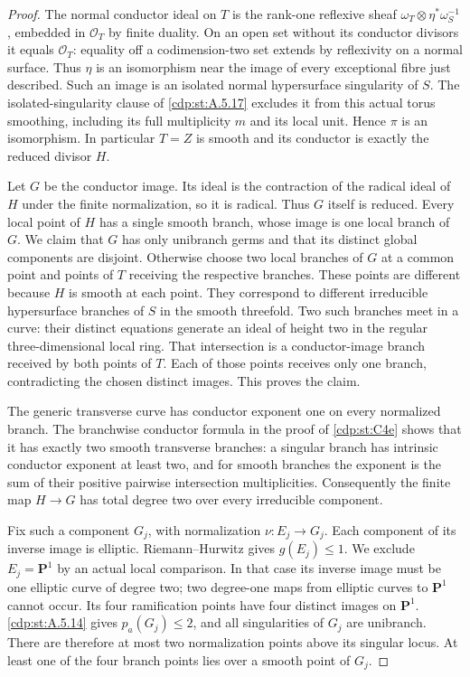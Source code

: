 \begin{proof}
The normal conductor ideal on $T$ is the rank-one reflexive
sheaf $\omega_T\otimes\eta^*\omega_S^{-1}$, embedded in
$\mathcal O_T$ by finite duality. On an open set without
its conductor divisors it equals $\mathcal O_T$: equality
off a codimension-two set extends by reflexivity on a normal
surface. Thus $\eta$ is an isomorphism near the image of
every exceptional fibre just described. Such an image is
an isolated normal hypersurface singularity of $S$.
The isolated-singularity clause of \ref{cdp:st:A.5.17} excludes it from
this actual torus smoothing, including its full multiplicity
$m$ and its local unit. Hence $\pi$ is an isomorphism.
In particular $T=Z$ is smooth and its conductor is exactly
the reduced divisor $H$.

Let $G$ be the conductor image. Its ideal is the contraction
of the radical ideal of $H$ under the finite normalization,
so it is radical. Thus $G$ itself is reduced. Every local
point of $H$ has a single smooth branch, whose image is one
local branch of $G$. We claim that $G$ has only unibranch
germs and that its distinct global components are disjoint.
Otherwise choose two local branches of $G$ at a common point
and points of $T$ receiving the respective branches. These
points are different because $H$ is smooth at each point.
They correspond to different irreducible hypersurface
branches of $S$ in the smooth threefold. Two such branches
meet in a curve: their distinct equations generate an ideal
of height two in the regular three-dimensional local ring.
That intersection is a conductor-image branch received by
both points of $T$. Each of those points receives only one
branch, contradicting the chosen distinct images. This
proves the claim.

The generic transverse curve has conductor exponent one on
every normalized branch. The branchwise conductor formula
in the proof of \ref{cdp:st:C4e} shows that it has exactly two smooth
transverse branches: a singular branch has intrinsic
conductor exponent at least two, and for smooth branches
the exponent is the sum of their positive pairwise
intersection multiplicities. Consequently the finite map
$H\to G$ has total degree two over every irreducible component.

Fix such a component $G_j$, with normalization
$\nu:E_j\to G_j$. Each component of its inverse image is
elliptic. Riemann--Hurwitz gives $g(E_j)\le1$.
We exclude $E_j=\mathbf P^1$ by an actual local comparison.
In that case its inverse image must be one elliptic curve
of degree two; two degree-one maps from elliptic curves to
$\mathbf P^1$ cannot occur. Its four ramification points
have four distinct images on $\mathbf P^1$. \ref{cdp:st:A.5.14} gives
$p_a(G_j)\le2$, and all singularities of $G_j$ are unibranch.
There are therefore at most two normalization points above
its singular locus. At least one of the four branch points
lies over a smooth point of $G_j$.


\end{proof}
